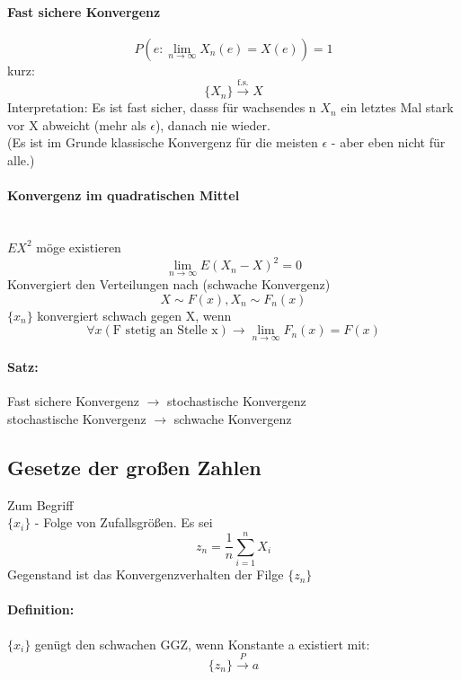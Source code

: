 \documentclass[a4paper,12pt]{scrartcl}
\begin{document}
 \paragraph{Fast sichere Konvergenz}
  
  $$P(e: \lim_{n\rightarrow\infty}X_n(e) = X(e)) = 1 $$
  kurz:
  $$\{X_n\}\overset{\text{f.s.}}{\rightarrow}X $$
  Interpretation:
  Es ist fast sicher, dasss für wachsendes n $X_n$ ein letztes Mal stark vor X abweicht (mehr als $\epsilon$), danach nie wieder.\\
  (Es ist im Grunde klassische Konvergenz für die meisten $\epsilon$ - aber eben nicht für alle.)\\
 \paragraph{Konvergenz im quadratischen Mittel}\quad\\
 $EX^2$ möge existieren
 $$\lim_{n\rightarrow\infty} E(X_n - X)^2 = 0$$
 Konvergiert den Verteilungen nach (schwache Konvergenz)
 $$X\sim F(x), X_n\sim F_n(x)$$
 $\{x_n\}$ konvergiert schwach gegen X, wenn
 $$\forall x (\text{F stetig an Stelle x})\rightarrow\lim_{n\rightarrow\infty}F_n(x)=F(x)$$
 \paragraph{Satz:}
 Fast sichere Konvergenz $\rightarrow$ stochastische Konvergenz\\
 stochastische Konvergenz $\rightarrow$ schwache Konvergenz
 
 \subsection{Gesetze der großen Zahlen}
 
 Zum Begriff\\
  $\{x_i\}$  - Folge von Zufallsgrößen. Es sei
  $$z_n = \frac{1}{n}\sum^{n}_{i=1} X_i$$
  Gegenstand ist das Konvergenzverhalten der Filge $\{z_n\}$\\
  \paragraph{Definition:} $\{x_i\}$ genügt den schwachen GGZ, wenn Konstante a existiert mit:
  $$\{z_n\}\overset{P}{\rightarrow}a$$
\end{document}
